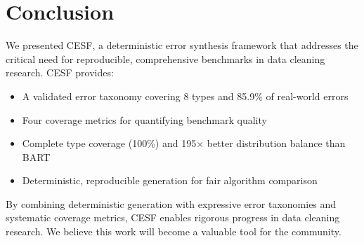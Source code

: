 \documentclass[11pt,a4paper]{article}
\begin{document}
\section{Conclusion}
\label{sec:conclusion}

We presented CESF, a deterministic error synthesis framework that addresses the critical need for reproducible, comprehensive benchmarks in data cleaning research. CESF provides:
\begin{itemize}
    \item A validated error taxonomy covering 8 types and 85.9\% of real-world errors
    \item Four coverage metrics for quantifying benchmark quality
    \item Complete type coverage (100\%) and 195$\times$ better distribution balance than BART
    \item Deterministic, reproducible generation for fair algorithm comparison
\end{itemize}

By combining deterministic generation with expressive error taxonomies and systematic coverage metrics, CESF enables rigorous progress in data cleaning research. We believe this work will become a valuable tool for the community.
\end{document}
